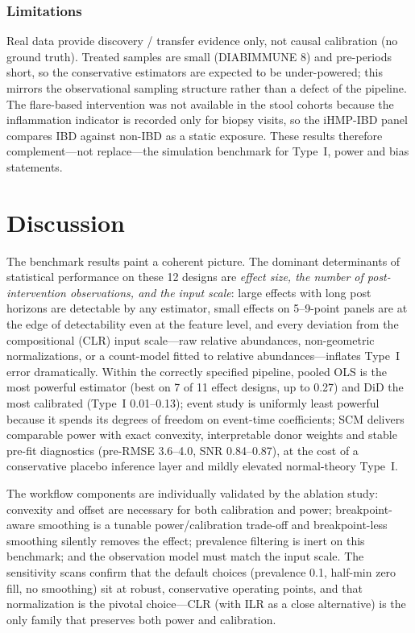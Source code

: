 \documentclass[11pt]{article}
\begin{document}
\subsubsection{Limitations}\label{sec:real-limits}

Real data provide discovery / transfer evidence only, not causal calibration (no ground truth).
Treated samples are small (DIABIMMUNE 8) and pre-periods short, so the conservative estimators are
expected to be under-powered; this mirrors the observational sampling structure rather than a defect
of the pipeline. The flare-based intervention was not available in the stool cohorts because the
inflammation indicator is recorded only for biopsy visits, so the iHMP-IBD panel compares IBD against
non-IBD as a static exposure. These results therefore complement---not replace---the simulation
benchmark for Type~I, power and bias statements.


\section{Discussion}\label{sec:discussion}

The benchmark results paint a coherent picture. The dominant determinants of statistical
performance on these 12 designs are \emph{effect size, the number of post-intervention
observations, and the input scale}: large effects with long post horizons are detectable by any
estimator, small effects on 5--9-point panels are at the edge of detectability even at the
feature level, and every deviation from the compositional (CLR) input scale---raw relative
abundances, non-geometric normalizations, or a count-model fitted to relative abundances---inflates
Type~I error dramatically. Within the correctly specified pipeline, pooled OLS is the most powerful
estimator (best on 7 of 11 effect designs, up to 0.27) and DiD the most calibrated
(Type~I 0.01--0.13); event study is uniformly least powerful because it spends its degrees of
freedom on event-time coefficients; SCM delivers comparable power with exact convexity,
interpretable donor weights and stable pre-fit diagnostics (pre-RMSE 3.6--4.0, SNR 0.84--0.87),
at the cost of a conservative placebo inference layer and mildly elevated normal-theory Type~I.

The workflow components are individually validated by the ablation study: convexity and offset are
necessary for both calibration and power; breakpoint-aware smoothing is a tunable
power/calibration trade-off and breakpoint-less smoothing silently removes the effect; prevalence
filtering is inert on this benchmark; and the observation model must match the input scale. The
sensitivity scans confirm that the default choices (prevalence 0.1, half-min zero fill, no
smoothing) sit at robust, conservative operating points, and that normalization is the pivotal
choice---CLR (with ILR as a close alternative) is the only family that preserves both power and
calibration.
\end{document}
